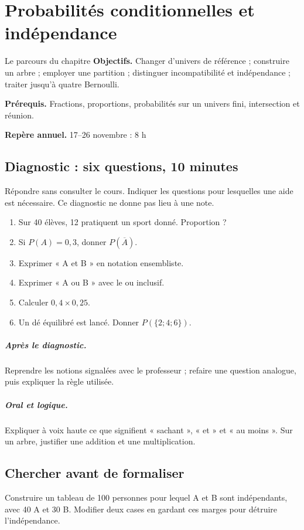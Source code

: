 \chapter{Probabilités conditionnelles et indépendance}\label{C05}
\begin{repere}{Le parcours du chapitre}
\textbf{Objectifs.} Changer d’univers de référence ; construire un arbre ; employer une partition ; distinguer incompatibilité et indépendance ; traiter jusqu’à quatre Bernoulli.

\textbf{Prérequis.} Fractions, proportions, probabilités sur un univers fini, intersection et réunion.

\textbf{Repère annuel.} 17–26 novembre : 8 h\end{repere}
\section*{Diagnostic : six questions, 10 minutes}\label{C05-D}
Répondre sans consulter le cours. Indiquer les questions pour lesquelles une aide est nécessaire. Ce diagnostic ne donne pas lieu à une note.
\begin{enumerate}
\item Sur 40 élèves, 12 pratiquent un sport donné. Proportion ?
\item Si $P(A)=0{,}3$, donner $P(\overline A)$.
\item Exprimer « A et B » en notation ensembliste.
\item Exprimer « A ou B » avec le ou inclusif.
\item Calculer $0{,}4\times0{,}25$.
\item Un dé équilibré est lancé. Donner $P(\{2;4;6\})$.
\end{enumerate}
\paragraph{Après le diagnostic.} Reprendre les notions signalées avec le professeur ; refaire une question analogue, puis expliquer la règle utilisée.
\paragraph{Oral et logique.} Expliquer à voix haute ce que signifient « sachant », « et » et « au moins ». Sur un arbre, justifier une addition et une multiplication.
\clearpage
\section*{Chercher avant de formaliser}\label{C05-RECH}
Construire un tableau de 100 personnes pour lequel A et B sont indépendants, avec 40 A et 30 B. Modifier deux cases en gardant ces marges pour détruire l’indépendance.
